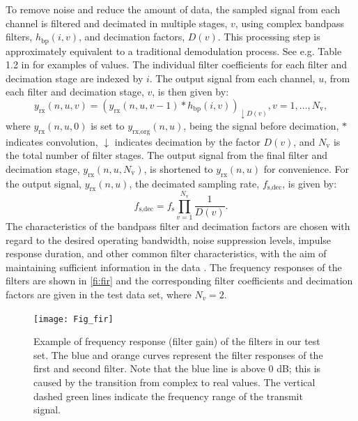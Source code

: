 \documentclass[preprint,12pt,TurnOnLineNumbers]{JASAnew}
\newcommand{\samplesymt}{n}
\newcommand{\genidxsym}{i}
\newcommand{\channelsym}{u}
\newcommand{\stagesym}{v}
\newcommand{\nstages}{N_{\textrm{v}}}
\newcommand{\fs}{f_{\textrm{s}}}
\newcommand{\fsdec}{f_{\textrm{s,dec}}}
\newcommand{\yrx}{y_{\textrm{rx}}}
\newcommand{\yrxorg}{y_{\textrm{rx,org}}}
\newcommand{\decfac}{D}
\newcommand{\hbp}{h_{\textrm{bp}}}
\begin{document}
To remove noise and reduce the amount of data, the sampled signal from each channel is filtered and decimated in multiple stages, $\stagesym$, using complex bandpass filters, $\hbp(\genidxsym,\stagesym)$, and decimation factors, $\decfac(\stagesym)$. This processing step is approximately equivalent to a traditional demodulation process. See e.g. Table 1.2 in \citep{Demer2017} for examples of values. The individual filter coefficients for each filter and decimation stage are indexed by $\genidxsym$. The output signal from each channel, $\channelsym$, from each filter and decimation stage, $\stagesym$, is then given by:
%
\begin{equation}
\label{eq:yrx}
\yrx(\samplesymt,\channelsym,\stagesym) = \left( \yrx(\samplesymt,\channelsym,\stagesym-1) * \hbp(\genidxsym,\stagesym) \right)_{\downarrow \decfac(\stagesym)}, 
\stagesym = 1,\ldots,\nstages,
\end{equation}
%
where $\yrx(\samplesymt,\channelsym,0)$ is set to $\yrxorg(\samplesymt,\channelsym)$, being the signal before decimation, $*$ indicates convolution, $\downarrow$ indicates decimation by the factor $\decfac(\stagesym)$, and $\nstages$ is the total number of filter stages. The output signal from the final filter and decimation stage, $\yrx(\samplesymt,\channelsym,\nstages)$, is shortened to $\yrx(\samplesymt,\channelsym)$ for convenience. For the output signal, $\yrx(\samplesymt,\channelsym)$, the decimated sampling rate, $\fsdec$, is given by:
%
\begin{equation}
\label{eq:fsdec}
\fsdec = \fs\prod_{\stagesym=1}^{\nstages} \frac{1}{\decfac(\stagesym)}.
\end{equation}
%
The characteristics of the bandpass filter and decimation factors are chosen with regard to the desired operating bandwidth, noise suppression levels, impulse response duration, and other common filter characteristics, with the aim of maintaining sufficient information in the data \citep{ProakisDSP,CrochireMDSP}. The frequency responses of the filters are shown in \autoref{fi:fir} and the corresponding filter coefficients and decimation factors are given in the test data set, where $N_v=2$.

\begin{figure}
\texttt{[image: Fig\_fir]}
\caption{\label{fi:fir} Example of frequency response (filter gain) of the filters in our test set. The blue and orange curves represent the filter responses of the first and second filter. Note that the blue line is above 0 dB; this is caused by the transition from complex to real values. The vertical dashed green lines indicate the frequency range of the transmit signal.}
\end{figure}
\end{document}
